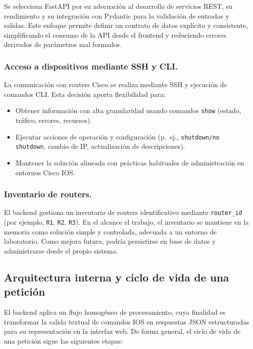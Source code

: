 Se selecciona FastAPI por su adecuación al desarrollo de servicios REST, su rendimiento y su integración con Pydantic para la validación de entradas y salidas. Este enfoque permite definir un contrato de datos explícito y consistente, simplificando el consumo de la API desde el frontend y reduciendo errores derivados de parámetros mal formados.

\subsubsection*{Acceso a dispositivos mediante SSH y CLI.}
\vspace*{0.5cm}

La comunicación con routers Cisco se realiza mediante SSH y ejecución de comandos CLI. Esta decisión aporta flexibilidad para:

\begin{itemize}
    \item Obtener información con alta granularidad usando comandos \texttt{show} (estado, tráfico, errores, recursos).
    \item Ejecutar acciones de operación y configuración (p.\ ej., \texttt{shutdown/no shutdown}, cambio de IP, actualización de descripciones).
    \item Mantener la solución alineada con prácticas habituales de administración en entornos Cisco IOS.
\end{itemize}

\subsubsection*{Inventario de routers.}
\vspace*{0.5cm}

El backend gestiona un inventario de routers identificativo mediante  \texttt{router\_id} (por ejemplo, \texttt{R1}, \texttt{R2}, \texttt{R3}). En el alcance el trabajo, el inventario se mantiene en la memoria como solución simple y controlada, adecuada a un entorno de laboratorio. Como mejora futura, podría persistirse en base de datos y administrarse desde el propio sistema.

\subsection*{Arquitectura interna y ciclo de vida de una petición}

El backend aplica un flujo homogéneo de procesamiento, cuya finalidad es transformar la salida textual de comandos IOS en respuestas JSON estructuradas para su representación en la interfaz web. De forma general, el ciclo de vida de una petición sigue las siguientes etapas:

